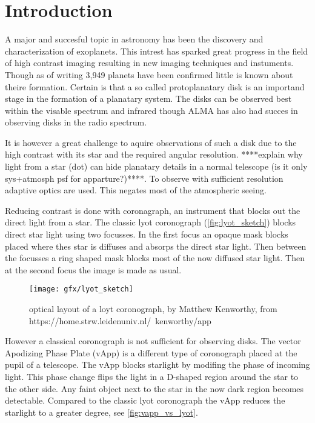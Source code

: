 
\chapter{Introduction} %

\label{ch:intro} %


A major and succesful topic in astronomy has been the discovery and characterization of exoplanets. This intrest has sparked great progress in the field of high contrast imaging resulting in new imaging techniques and instuments. Though as of writing 3,949 planets \cite{nasa} have been confirmed little is known about theire formation. Certain is that a so called protoplanatary disk is an importand stage in the formation of a planatary system. The disks can be observed best within the visable spectrum and infrared though ALMA has also had succes in observing disks in the radio spectrum. 

It is however a great challenge to aquire observations of such a disk due to the high contrast with its star and the required angular resolution. ****explain why light from a star (dot) can hide planatary details in a normal telescope (is it only sys+atmosph psf for apparture?)****. To observe with sufficient resolution adaptive optics are used. This negates most of the atmospheric seeing.

Reducing contrast is done with coronagraph, an instrument that blocks out the direct light from a star. The classic lyot coronograph (\autoref{fig:lyot_sketch}) blocks direct star light using two focusses. In the first focus an opaque mask blocks placed where thes star is diffuses and absorps the direct star light. Then between the focusses a ring shaped mask blocks most of the now diffused star light. Then at the second focus the image is made as usual.

\begin{figure}
    \texttt{[image: gfx/lyot\_sketch]}
    \caption{optical layout of a loyt coronograph, by Matthew Kenworthy, from https://home.strw.leidenuniv.nl/~kenworthy/app}
    \label{fig:lyot_sketch}
\end {figure}

However a classical coronograph is not sufficient for observing disks. The vector Apodizing Phase Plate (vApp) \cite{papervApp} is a different type of coronograph placed at the pupil of a telescope. The vApp blocks starlight by modifing the phase of incoming light. This phase change flips the light in a D-shaped region around the star to the other side. Any faint object next to the star in the now dark region becomes detectable. Compared to the classic lyot coronograph the vApp reduces the starlight to a greater degree, see \autoref{fig:vapp_vs_lyot}.  

